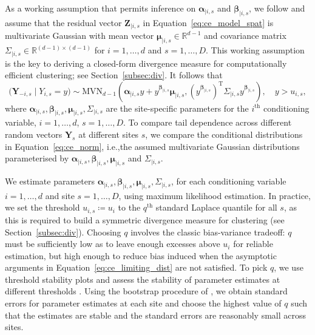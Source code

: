 \documentclass[preprint,12pt,authoryear]{elsarticle}
\newcommand{\mvmean}[1]{\boldsymbol{\alpha}_{\mid i, #1} y + y^{\boldsymbol{\beta}_{\mid i, #1}} \boldsymbol{\mu}_{\mid i, #1}}
\newcommand{\mvcov}[1]{\left(y^{\boldsymbol{\beta}_{\mid i, #1}}\right)^{\mathrm{T}} \Sigma_{\mid i, #1} y^{\boldsymbol{\beta}_{\mid i, #1}}}
\begin{document}
As a working assumption that permits inference on $\boldsymbol{\alpha}_{\mid i, s}$ and $\boldsymbol{\beta}_{\mid i, s}$, we follow \citet{Heffernan2004} and assume that the residual vector $\boldsymbol{Z}_{\mid i, s}$ in Equation~\eqref{eq:ce_model_spat} is multivariate Gaussian with mean vector $\boldsymbol{\mu}_{\mid i, s} \in\mathbb{R}^{d-1}$ and covariance matrix $\Sigma_{\mid i, s}\in\mathbb{R}^{(d-1)\times(d-1)}$ for $i = 1, \ldots, d$ and $s = 1, \ldots, D$.
This working assumption is the key to deriving a closed-form divergence measure for computationally efficient clustering; see Section~\ref{subsec:div}.
It follows that 
\begin{equation}\label{eq:ce_norm}
  \bigl(\boldsymbol{Y}_{-i, s} \mid Y_{i, s} = y\bigr) \sim \mbox{MVN}_{d-1}\left(\mvmean{s}, \mvcov{s}\right),\quad y > u_{i, s},
\end{equation}
where $\boldsymbol{\alpha}_{\mid i, s}, \boldsymbol{\beta}_{\mid i, s}, \boldsymbol{\mu}_{\mid i, s}, \Sigma_{\mid i, s}$ are the site-specific parameters for the $i^{\text{th}}$ conditioning variable, $i = 1, \ldots, d$, $s = 1, \ldots, D$.
To compare tail dependence across different random vectors $\boldsymbol{Y}_{s}$ at different sites $s$, we compare the conditional distributions in Equation~\eqref{eq:ce_norm}, i.e.,\@ the assumed multivariate Gaussian distributions parameterised by $\boldsymbol{\alpha}_{\mid i, s},\boldsymbol{\beta}_{\mid i, s},\boldsymbol{\mu}_{\mid i, s}$ and $\Sigma_{\mid i, s}$.

We estimate parameters $\boldsymbol{\alpha}_{\mid i, s}, \boldsymbol{\beta}_{\mid i, s}, \boldsymbol{\mu}_{\mid i, s}, \Sigma_{\mid i, s}$, for each conditioning variable $i = 1, \ldots, d$ and site $s = 1, \ldots, D$, using maximum likelihood estimation.
In practice, we set the threshold $u_{i, s} \coloneqq u_i$ to the $q^{\text{th}}$ standard Laplace quantile for all $s$, as this is required to build a symmetric divergence measure for clustering (see Section~\ref{subsec:div}).
Choosing $q$ involves the classic bias-variance tradeoff: $q$ must be sufficiently low as to leave enough excesses above $u_i$ for reliable estimation, but high enough to reduce bias induced when the asymptotic arguments in Equation~\eqref{eq:ce_limiting_dist} are not satisfied. 
To pick $q$, we use threshold stability plots and assess the stability of parameter estimates at different thresholds \citep{Southworth2012}. 
Using the bootstrap procedure of \citet{Heffernan2004}, we obtain standard errors for parameter estimates at each site and choose the highest value of $q$ such that the estimates are stable and the standard errors are reasonably small across sites. 
\end{document}
